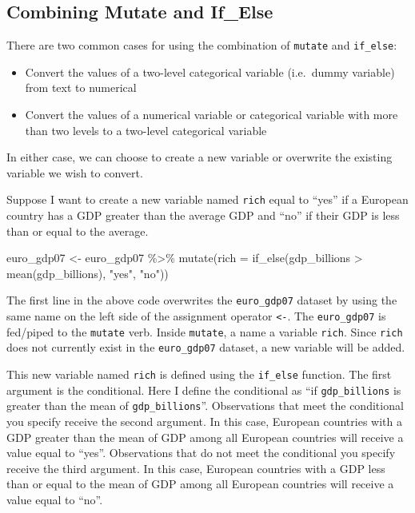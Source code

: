 \documentclass[
]{book}
\makeatletter
\newenvironment{Shaded}{\begin{snugshade}}{\end{snugshade}}
\newcommand{\AttributeTok}[1]{\textcolor[rgb]{0.61,0.61,0.61}{#1}}
\newcommand{\FunctionTok}[1]{\textcolor[rgb]{0,0,0}{#1}}
\newcommand{\NormalTok}[1]{#1}
\newcommand{\OtherTok}[1]{\textcolor[rgb]{0.37,0.37,0.37}{#1}}
\newcommand{\SpecialCharTok}[1]{\textcolor[rgb]{0,0,0}{#1}}
\newcommand{\StringTok}[1]{\textcolor[rgb]{0.5,0.5,0.5}{#1}}
\providecommand{\tightlist}{%
  \setlength{\itemsep}{0pt}\setlength{\parskip}{0pt}}
\newenvironment{kframe}{%
\medskip{}
\setlength{\fboxsep}{.8em}
 \def\at@end@of@kframe{}%
 \ifinner\ifhmode%
  \def\at@end@of@kframe{\end{minipage}}%
  \begin{minipage}{\columnwidth}%
 \fi\fi%
 \def\FrameCommand##1{\hskip\@totalleftmargin \hskip-\fboxsep
 \colorbox{shadecolor}{##1}\hskip-\fboxsep
     \hskip-\linewidth \hskip-\@totalleftmargin \hskip\columnwidth}%
 \MakeFramed {\advance\hsize-\width
   \@totalleftmargin\z@ \linewidth\hsize
   \@setminipage}}%
 {\par\unskip\endMakeFramed%
 \at@end@of@kframe}
\renewenvironment{Shaded}{\begin{kframe}}{\end{kframe}}
\makeatother
\begin{document}
\hypertarget{combining-mutate-and-if_else}{%
\subsection{Combining Mutate and If\_Else}\label{combining-mutate-and-if_else}}

There are two common cases for using the combination of \texttt{mutate} and \texttt{if\_else}:

\begin{itemize}
\tightlist
\item
  Convert the values of a two-level categorical variable (i.e.~dummy variable) from text to numerical
\item
  Convert the values of a numerical variable or categorical variable with more than two levels to a two-level categorical variable
\end{itemize}

In either case, we can choose to create a new variable or overwrite the existing variable we wish to convert.

Suppose I want to create a new variable named \texttt{rich} equal to ``yes'' if a European country has a GDP greater than the average GDP and ``no'' if their GDP is less than or equal to the average.

\begin{Shaded}
\begin{Highlighting}[]
\NormalTok{euro\_gdp07 }\OtherTok{\textless{}{-}}\NormalTok{ euro\_gdp07 }\SpecialCharTok{\%\textgreater{}\%} 
  \FunctionTok{mutate}\NormalTok{(}\AttributeTok{rich =} \FunctionTok{if\_else}\NormalTok{(gdp\_billions }\SpecialCharTok{\textgreater{}} \FunctionTok{mean}\NormalTok{(gdp\_billions), }\StringTok{"yes"}\NormalTok{, }\StringTok{"no"}\NormalTok{))}
\end{Highlighting}
\end{Shaded}

The first line in the above code overwrites the \texttt{euro\_gdp07} dataset by using the same name on the left side of the assignment operator \texttt{\textless{}-}. The \texttt{euro\_gdp07} is fed/piped to the \texttt{mutate} verb. Inside \texttt{mutate}, a name a variable \texttt{rich}. Since \texttt{rich} does not currently exist in the \texttt{euro\_gdp07} dataset, a new variable will be added.

This new variable named \texttt{rich} is defined using the \texttt{if\_else} function. The first argument is the conditional. Here I define the conditional as ``if \texttt{gdp\_billions} is greater than the mean of \texttt{gdp\_billions}''. Observations that meet the conditional you specify receive the second argument. In this case, European countries with a GDP greater than the mean of GDP among all European countries will receive a value equal to ``yes''. Observations that do not meet the conditional you specify receive the third argument. In this case, European countries with a GDP less than or equal to the mean of GDP among all European countries will receive a value equal to ``no''.
\end{document}
